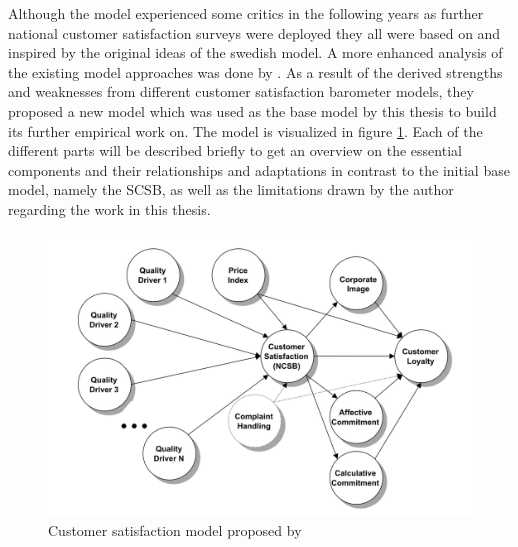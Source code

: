 Although the model experienced some critics in the following years as further national customer satisfaction surveys were deployed they all were based on and inspired by the original ideas of the swedish model. A more enhanced analysis of the existing model approaches was done by \cite{johnson2001evolution}. As a result of the derived strengths and weaknesses from different customer satisfaction barometer models, they proposed a new model which was used as the base model by this thesis to build its further empirical work on. The model is visualized in figure \ref{fig:satisfactionModel}. Each of the different parts will be described briefly to get an overview on the essential components and their relationships and adaptations in contrast to the initial base model, namely the SCSB, as well as the limitations drawn by the author regarding the work in this thesis. 

\begin{figure}
	\centering
	\includegraphics[width=1.0\textwidth]{img/custSatisfaction.png}
	\caption{Customer satisfaction model proposed by \cite{johnson2001evolution}}
	\label{fig:satisfactionModel}
\end{figure} 

